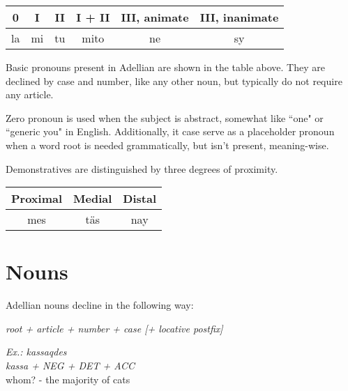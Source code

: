 \documentclass[12pt]{article}
\newcommand{\example}[3]{
	\colorbox{light-gray}{
		\parbox{5in}{
			\emph{Ex.: #1}\\
				  \emph{#2}\\
				  #3
		  }
	}
}
\begin{document}
	\begin{tabular}{|| c | c | c | c | c | c ||}
		\hline
		0 & I & II & I + II & III, animate & III, inanimate\\
		\hline
		la & mi & tu & mito & ne & sy\\
		\hline
	\end{tabular}

	Basic pronouns present in Adellian are shown in the table above. They are declined by case and number, like any other noun, but typically do not require any article.
	
	Zero pronoun is used when the subject is abstract, somewhat like ``one" or ``generic you" in English. Additionally, it case serve as a placeholder pronoun when a word root is needed grammatically, but isn't present, meaning-wise.

	Demonstratives are distinguished by three degrees of proximity.

	\begin{tabular}{|| c | c | c ||}
		\hline
		Proximal & Medial & Distal \\
		\hline
		mes & täs &  nay \\
		\hline
	\end{tabular}

	\section{Nouns}
	
	Adellian nouns decline in the following way:
	
	\emph{root + article + number + case [+ locative postfix]}
	
	\example {kassaqdes}
			 {kassa + NEG + DET + ACC}
		 	 {whom? - the majority of cats}
	
\end{document}
